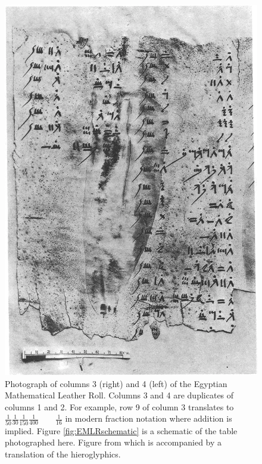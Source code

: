 \begin{figure}
  \centering
  \includegraphics[width=\textwidth]{gfx/EMLR}
  \caption[Photograph of columns 3 and 4 of the Egyptian Mathematical Leather Roll.]
  {Photograph of columns 3 (right) and 4 (left) of the Egyptian Mathematical Leather Roll. Columns 3 and 4 are duplicates of columns 1 and 2. For example, row 9 of column 3 translates to $\displaystyle \frac{1}{50}\frac{1}{30}\frac{1}{150}\frac{1}{400} \quad\quad \frac{1}{16}$ in modern fraction notation where addition is implied. Figure \ref{fig:EMLRschematic} is a schematic of the table photographed here. Figure from \citet{Glanville27} which is accompanied by a translation of the hieroglyphics.}
  \label{fig:EMLR}
\end{figure}

